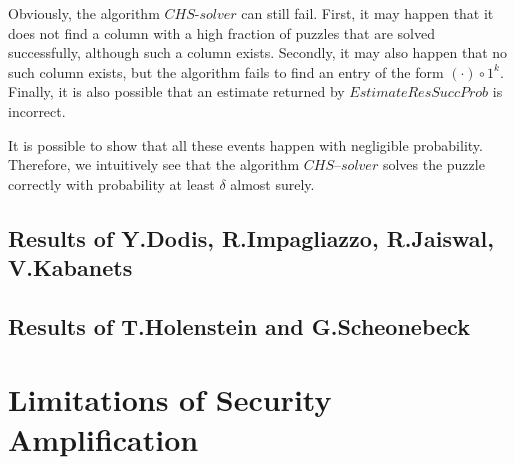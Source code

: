 \documentclass[11pt,a4paper,titlepage]{memoir}
\begin{document}
Obviously, the algorithm $\mathit{CHS\text{-}solver}$ can still fail. First, it may happen that it does not find a column
with a high fraction of puzzles that are solved successfully, although such a column exists.
Secondly, it may also happen that no such column exists, but the algorithm fails to find an entry of the form $(\cdot) \circ 1^k$.
Finally, it is also possible that an estimate returned by $\mathit{EstimateResSuccProb}$ is incorrect.

It is possible to show that all these events happen with negligible probability.
Therefore, we intuitively see that the algorithm $\mathit{CHS\text{--}solver}$
solves the puzzle correctly with probability at least $\delta$ almost surely.
%
\subsection{Results of Y.Dodis, R.Impagliazzo, R.Jaiswal, V.Kabanets}
\subsection{Results of T.Holenstein and G.Scheonebeck}
\section{Limitations of Security Amplification}



\appendix


\backmatter



\end{document}
